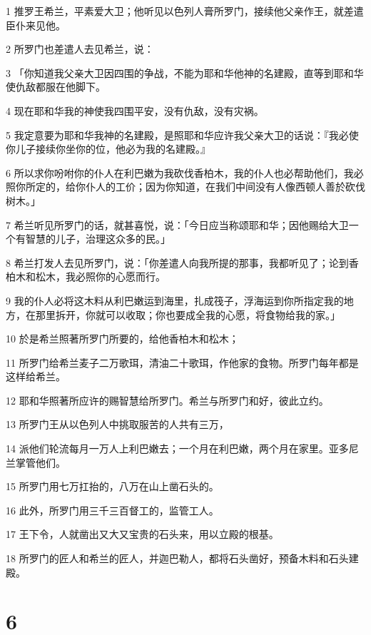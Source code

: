 \par 1 推罗王希兰，平素爱大卫；他听见以色列人膏所罗门，接续他父亲作王，就差遣臣仆来见他。
\par 2 所罗门也差遣人去见希兰，说：
\par 3 「你知道我父亲大卫因四围的争战，不能为耶和华他神的名建殿，直等到耶和华使仇敌都服在他脚下。
\par 4 现在耶和华我的神使我四围平安，没有仇敌，没有灾祸。
\par 5 我定意要为耶和华我神的名建殿，是照耶和华应许我父亲大卫的话说：『我必使你儿子接续你坐你的位，他必为我的名建殿。』
\par 6 所以求你吩咐你的仆人在利巴嫩为我砍伐香柏木，我的仆人也必帮助他们，我必照你所定的，给你仆人的工价；因为你知道，在我们中间没有人像西顿人善於砍伐树木。」
\par 7 希兰听见所罗门的话，就甚喜悦，说：「今日应当称颂耶和华；因他赐给大卫一个有智慧的儿子，治理这众多的民。」
\par 8 希兰打发人去见所罗门，说：「你差遣人向我所提的那事，我都听见了；论到香柏木和松木，我必照你的心愿而行。
\par 9 我的仆人必将这木料从利巴嫩运到海里，扎成筏子，浮海运到你所指定我的地方，在那里拆开，你就可以收取；你也要成全我的心愿，将食物给我的家。」
\par 10 於是希兰照著所罗门所要的，给他香柏木和松木；
\par 11 所罗门给希兰麦子二万歌珥，清油二十歌珥，作他家的食物。所罗门每年都是这样给希兰。
\par 12 耶和华照著所应许的赐智慧给所罗门。希兰与所罗门和好，彼此立约。
\par 13 所罗门王从以色列人中挑取服苦的人共有三万，
\par 14 派他们轮流每月一万人上利巴嫩去；一个月在利巴嫩，两个月在家里。亚多尼兰掌管他们。
\par 15 所罗门用七万扛抬的，八万在山上凿石头的。
\par 16 此外，所罗门用三千三百督工的，监管工人。
\par 17 王下令，人就凿出又大又宝贵的石头来，用以立殿的根基。
\par 18 所罗门的匠人和希兰的匠人，并迦巴勒人，都将石头凿好，预备木料和石头建殿。

\chapter{6}

